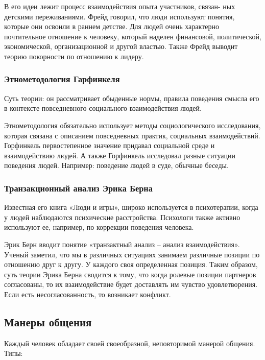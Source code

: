 \documentclass[a4paper,14pt]{extarticle}
\begin{document}
В его идеи лежит процесс взаимодействия опыта участников, связан-
ных детскими переживаниями. Фрейд говорил, что люди используют понятия, которые они освоили в раннем детстве. Для людей очень характерно почтительное отношение к человеку, который наделен финансовой, политической, экономической, организационной и другой властью. Также Фрейд выводит теорию покорности по отношению к лидеру.

\subsubsection{Этнометодология Гарфинкеля}

Суть теории: он рассматривает обыденные нормы, правила поведения смысла его в контексте повседневного социального взаимодействия людей.

Этнометодология обязательно использует методы социологического исследования, которая связана с описанием повседневных практик, социальных взаимодействий. Горфинкель первостепенное значение придавал социальной среде и взаимодействию людей. А также Горфинкель исследовал разные ситуации поведения людей. Например: поведение людей в суде, обычные беседы.

\subsubsection{Транзакционный анализ Эрика Берна}

Известная его книга «Люди и игры», широко используется в психотерапии, когда у людей наблюдаются психические расстройства. Психологи также активно используют ее, например, по коррекции поведения человека.

Эрик Берн вводит понятие «транзактный анализ – анализ взаимодействия». Ученый заметил, что мы в различных ситуациях занимаем различные позиции по отношению друг к другу. У каждого своя определенная позиция. Таким образом, суть теории Эрика Берна сводится к тому, что когда ролевые позиции партнеров согласованы, то их взаимодействие будет доставлять им чувство удовлетворения. Если есть несогласованность, то возникает конфликт.

\subsection{Манеры общения}

Каждый человек обладает своей своеобразной, неповторимой манерой общения. Типы:
\end{document}
